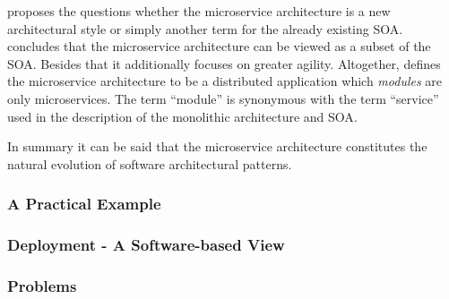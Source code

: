 \autocite{VillamizarEvaluatingmonolithicmicroservice2015} proposes the
questions whether the microservice architecture is a new architectural style or
simply another term for the already existing \ac{SOA}.
\autocite{VillamizarEvaluatingmonolithicmicroservice2015} concludes that the
microservice architecture can be viewed as a subset of the \ac{SOA}. Besides
that it additionally focuses on greater agility. Altogether,
\autocite{DragoniMicroservicesyesterdaytoday2016} defines the microservice
architecture to be a distributed application which \textit{modules} are only
microservices. The term \enquote{module} is synonymous with the term
\enquote{service} used in the description of the monolithic architecture and
\ac{SOA}.

In summary it can be said that the microservice architecture constitutes the
natural evolution of software architectural patterns.

\subsubsection{A Practical Example}%
\label{ssub:A_Practical_Example}

\subsubsection{Deployment - A Software-based View}%
\label{ssub:Deployment_-_A_Software-based_View}

\subsubsection{Problems}%
\label{ssub:Problems}


